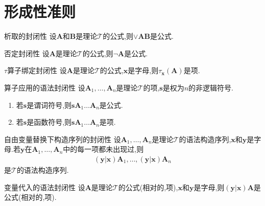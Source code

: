 \section{形成性准则}

\begin{metatheorem}{析取的封闭性}{}
	设$\boldsymbol{A}$和$\boldsymbol{B}$是理论$\mathcal{T}$的公式,则$\vee\boldsymbol{A}\boldsymbol{B}$是公式.
\end{metatheorem}

\begin{metatheorem}{否定封闭性}{}
	设$\boldsymbol{A}$是理论$\mathcal{T}$的公式,则$\neg\boldsymbol{A}$是公式.
\end{metatheorem}

\begin{metatheorem}{$\tau$算子绑定封闭性}{}
	设$\boldsymbol{A}$是理论$\mathcal{T}$的公式,$\boldsymbol{x}$是字母,则$\tau_{\boldsymbol{x}}\left(\boldsymbol{A}\right)$是项.
\end{metatheorem}

\begin{metatheorem}{算子应用的语法封闭性}{}
	设$\boldsymbol{A}_{1},\ldots,\boldsymbol{A}_{n}$是理论$\mathcal{T}$的项,$\boldsymbol{s}$是权为$n$的非逻辑符号.
	\begin{enumerate}
		\item 若$\boldsymbol{s}$是谓词符号,则$\boldsymbol{s}\boldsymbol{A}_{1}\ldots\boldsymbol{A}_{n}$是公式.
		\item 若$\boldsymbol{s}$是函数符号,则$\boldsymbol{s}\boldsymbol{A}_{1}\ldots\boldsymbol{A}_{n}$是项.
	\end{enumerate}
\end{metatheorem}

\begin{metatheorem}{自由变量替换下构造序列的封闭性}{}
	设$\boldsymbol{A}_{1},\ldots,\boldsymbol{A}_{n}$是理论$\mathcal{T}$的语法构造序列,$\boldsymbol{x}$和$\boldsymbol{y}$是字母.若$\boldsymbol{y}$在$\boldsymbol{A}_{1},\ldots,\boldsymbol{A}_{n}$中的每一项都未出现过,则
	\begin{align*}
		\left(\boldsymbol{y}|\boldsymbol{x}\right)\boldsymbol{A}_{1},\ldots,\left(\boldsymbol{y}|\boldsymbol{x}\right)\boldsymbol{A}_{n}
	\end{align*}
	是$\mathcal{T}$的语法构造序列.
\end{metatheorem}

\begin{metatheorem}{变量代入的语法封闭性}{}
	设$\boldsymbol{A}$是理论$\mathcal{T}$的公式(相对的,项),$\boldsymbol{x}$和$\boldsymbol{y}$是字母,则$\left(\boldsymbol{y}|\boldsymbol{x}\right)\boldsymbol{A}$是公式(相对的,项).
\end{metatheorem}

